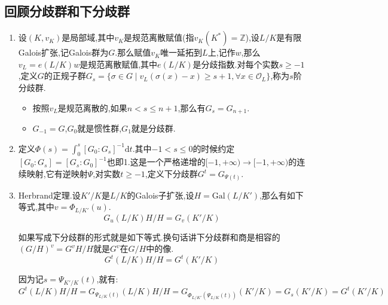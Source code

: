 \subsection{回顾分歧群和下分歧群}
\begin{enumerate}
	\item 设$(K,v_K)$是局部域,其中$v_K$是规范离散赋值(指$v_K(K^*)=\mathbb{Z}$),设$L/K$是有限Galois扩张,记Galois群为$G$.那么赋值$v_K$唯一延拓到$L$上,记作$w$,那么$v_L=e(L/K)w$是规范离散赋值,其中$e(L/K)$是分歧指数.对每个实数$s\ge -1$,定义$G$的正规子群$G_s=\{\sigma\in G\mid v_L(\sigma(x)-x)\ge s+1,\forall x\in\mathscr{O}_L\}$,称为$s$阶分歧群.
	\begin{itemize}
		\item 按照$v_L$是规范离散的,如果$n<s\le n+1$,那么有$G_s=G_{n+1}$.
		\item $G_{-1}=G$,$G_0$就是惯性群,$G_1$就是分歧群.
	\end{itemize}
	\item 定义$\Phi(s)=\int_0^s[G_0:G_s]^{-1}\mathrm{d}t$.其中$-1<s\le0$的时候约定$[G_0:G_s]=[G_s:G_0]^{-1}$也即1.这是一个严格递增的$[-1,+\infty)\to[-1,+\infty)$的连续映射,它有逆映射$\Psi$,对实数$t\ge-1$,定义下分歧群$G^t=G_{\Psi(t)}$.
	\item Herbrand定理.设$K'/K$是$L/K$的Galois子扩张,设$H=\mathrm{Gal}(L/K')$,那么有如下等式,其中$v=\Phi_{L/K'}(u)$.
	$$G_u(L/K)H/H=G_v(K'/K)$$
	
	如果写成下分歧群的形式就是如下等式.换句话讲下分歧群和商是相容的$(G/H)^v=G^vH/H$就是$G^v$在$G/H$中的像.
	$$G^t(L/K)H/H=G^t(K'/K)$$
	
	因为记$s=\Psi_{K'/K}(t)$,就有:
	$$G^t(L/K)H/H=G_{\Psi_{L/K}(t)}(L/K)H/H=G_{\Phi_{L/K'}(\Psi_{L/K}(t))}(K'/K)=G_s(K'/K)=G^t(K'/K)$$
\end{enumerate}

